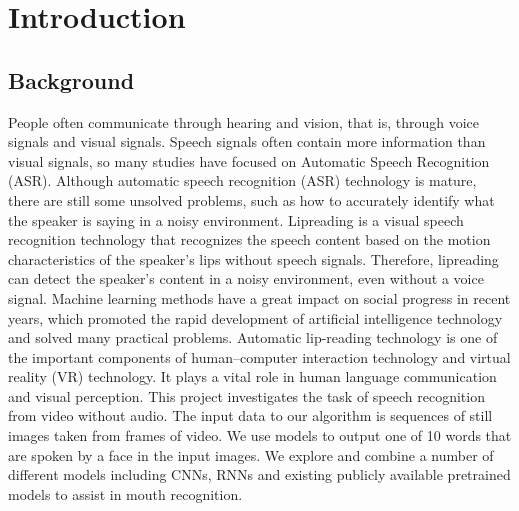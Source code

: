 \chapter{Introduction}

\section{Background}
	People often communicate through hearing and vision, that is, through voice signals and visual signals. Speech signals often contain more information than visual signals, so many studies have focused on Automatic Speech Recognition (ASR). Although automatic speech recognition (ASR) technology is mature, there are still some unsolved problems, such as how to accurately identify what the speaker is saying in a noisy environment. Lipreading is a visual speech recognition technology that recognizes the speech content based on the motion characteristics of the speaker’s lips without speech signals. Therefore, lipreading can detect the speaker’s content in a noisy environment, even without a voice signal.
Machine learning methods have a great impact on social progress in recent years, which promoted the rapid development of artificial intelligence technology and solved many practical problems. Automatic lip-reading technology is one of the important components of human–computer interaction technology and virtual reality (VR) technology. It plays a vital role in human language communication and visual perception. This project investigates the task of speech recognition from video without audio. The input data to our algorithm is sequences of still images taken from frames of video. We use models to output one of 10 words that are spoken by a face in the input images. We explore and combine a number of different models including CNNs, RNNs and existing publicly available pretrained models to assist in mouth recognition.

\pagebreak
	
